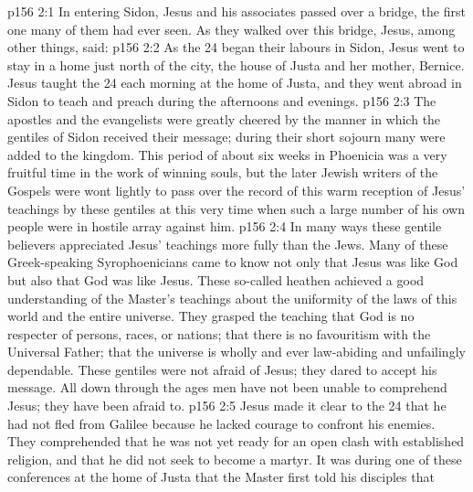 \vs p156 2:1 In entering Sidon, Jesus and his associates passed over a bridge, the first one many of them had ever seen. As they walked over this bridge, Jesus, among other things, said: 
\vs p156 2:2 \pc As the 24 began their labours in Sidon, Jesus went to stay in a home just north of the city, the house of Justa and her mother, Bernice. Jesus taught the 24 each morning at the home of Justa, and they went abroad in Sidon to teach and preach during the afternoons and evenings.
\vs p156 2:3 The apostles and the evangelists were greatly cheered by the manner in which the gentiles of Sidon received their message; during their short sojourn many were added to the kingdom. This period of about six weeks in Phoenicia was a very fruitful time in the work of winning souls, but the later Jewish writers of the Gospels were wont lightly to pass over the record of this warm reception of Jesus’ teachings by these gentiles at this very time when such a large number of his own people were in hostile array against him.
\vs p156 2:4 In many ways these gentile believers appreciated Jesus’ teachings more fully than the Jews. Many of these Greek\hyp{}speaking Syrophoenicians came to know not only that Jesus was like God but also that God was like Jesus. These so\hyp{}called heathen achieved a good understanding of the Master’s teachings about the uniformity of the laws of this world and the entire universe. They grasped the teaching that God is no respecter of persons, races, or nations; that there is no favouritism with the Universal Father; that the universe is wholly and ever law\hyp{}abiding and unfailingly dependable. These gentiles were not afraid of Jesus; they dared to accept his message. All down through the ages men have not been unable to comprehend Jesus; they have been afraid to.
\vs p156 2:5 \pc Jesus made it clear to the 24 that he had not fled from Galilee because he lacked courage to confront his enemies. They comprehended that he was not yet ready for an open clash with established religion, and that he did not seek to become a martyr. It was during one of these conferences at the home of Justa that the Master first told his disciples that 
